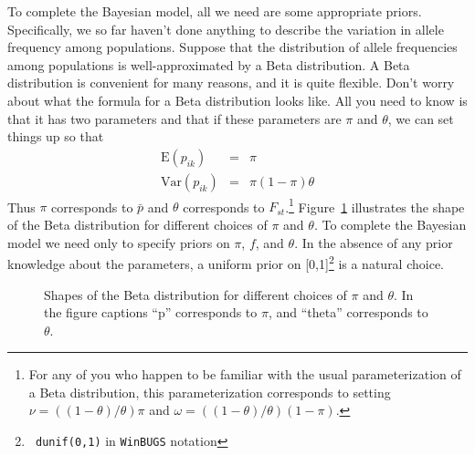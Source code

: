 To complete the Bayesian model, all we need are some appropriate
priors. Specifically, we so far haven't done anything to describe the
variation in allele frequency among populations. Suppose that the
distribution of allele frequencies among populations is
well-approximated by a Beta distribution. A Beta
distribution is convenient for many reasons, and it is quite
flexible. Don't worry about what the formula for a Beta distribution
looks like. All you need to know is that it has two parameters and
that if these parameters are $\pi$ and $\theta$, we can set things up
so that
\begin{eqnarray*}
\mbox{E}(p_{ik}) &=& \pi \\
\mbox{Var}(p_{ik}) &=& \pi(1-\pi)\theta
\end{eqnarray*}
Thus $\pi$ corresponds to $\bar p$ and $\theta$ corresponds to
$F_{st}$.\footnote{For any of you who happen to be familiar with the
usual parameterization of a Beta distribution, this parameterization
corresponds to setting $\nu = ((1-\theta)/\theta)\pi$ and $\omega =
((1-\theta)/\theta)(1-\pi)$.} Figure~\ref{fig:beta} illustrates the
shape of the Beta distribution for different choices of $\pi$ and
$\theta$. To complete the Bayesian model we need only to specify
priors on $\pi$, $f$, and $\theta$. In the absence of any prior
knowledge about the parameters, a uniform prior on [0,1]\footnote{{\tt
dunif(0,1)} in {\tt WinBUGS} notation} is a natural choice.
\begin{figure}
\caption{Shapes of the Beta distribution for different choices of
  $\pi$ and $\theta$. In the figure captions ``p'' corresponds to $\pi$,
  and ``theta'' corresponds to $\theta$.}\label{fig:beta}
\end{figure}

